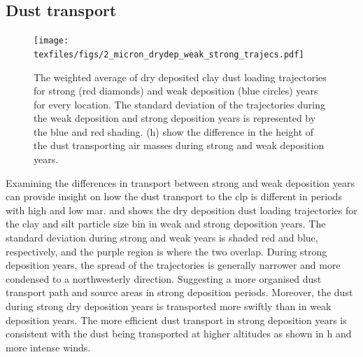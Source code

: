 \subsection{Dust transport}
\begin{figure}[htbp]
    \centering
    \texttt{[image: texfiles/figs/2\_micron\_drydep\_weak\_strong\_trajecs.pdf]}
    \caption{The weighted average of dry deposited clay dust loading trajectories for strong (red diamonds) and weak deposition (blue circles) years for every location. The standard deviation of the trajectories during the weak deposition and strong deposition years is represented by the blue and red shading.  (h) show the difference in the height of the dust transporting air masses during strong and weak deposition years. }
    \label{fig:strong_weak_drydepo_year_2mmu_trajecs}
\end{figure}

Examining the differences in transport between strong and weak deposition years can provide insight on how the dust transport to the \acrshort{clp} is different in periods with high and low \acrshort{mar}. 
 and  shows the dry deposition dust loading trajectories for the clay and silt particle size bin in weak and strong deposition years. 
The standard deviation during strong and weak years is shaded red and blue, respectively, and the purple region is where the two overlap. 
During strong deposition years, the spread of the trajectories is generally narrower and more condensed to a northwesterly direction.
Suggesting a more organised dust transport path and source areas in strong deposition periods.   
Moreover, the dust during strong dry deposition years is transported more swiftly than in weak deposition years. 
The more efficient dust transport in strong deposition years is consistent with the dust being transported at higher altitudes as shown in h and more intense winds.


